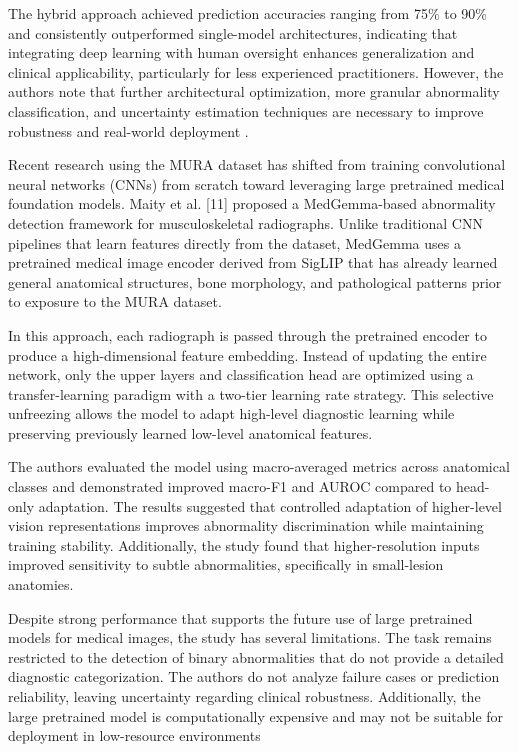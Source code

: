\documentclass[conference]{IEEEtran}
\begin{document}
The hybrid approach achieved prediction accuracies ranging from 75\% to 90\% and consistently outperformed single-model architectures, indicating that integrating deep learning with human oversight enhances generalization and clinical applicability, particularly for less experienced practitioners. However, the authors note that further architectural optimization, more granular abnormality classification, and uncertainty estimation techniques are necessary to improve robustness and real-world deployment \cite{duan2024_msk_xray_dl}.

Recent research using the MURA dataset has shifted from training convolutional neural networks (CNNs) from scratch toward leveraging large pretrained medical foundation models. Maity et al. [11] proposed a MedGemma-based abnormality detection framework for musculoskeletal radiographs. Unlike traditional CNN pipelines that learn features directly from the dataset, MedGemma uses a pretrained medical image encoder derived from SigLIP that has already learned general anatomical structures, bone morphology, and pathological patterns prior to exposure to the MURA dataset.

In this approach, each radiograph is passed through the pretrained encoder to produce a high-dimensional feature embedding. Instead of updating the entire network, only the upper layers and classification head are optimized using a transfer-learning paradigm with a two-tier learning rate strategy. This selective unfreezing allows the model to adapt high-level diagnostic learning while preserving previously learned low-level anatomical features.

The authors evaluated the model using macro-averaged metrics across anatomical classes and demonstrated improved macro-F1 and AUROC compared to head-only adaptation. The results suggested that controlled adaptation of higher-level vision representations improves abnormality discrimination while maintaining training stability. Additionally, the study found that higher-resolution inputs improved sensitivity to subtle abnormalities, specifically in small-lesion anatomies. 

Despite strong performance that supports the future use of large pretrained models for medical images, the study has several limitations. The task remains restricted to the detection of binary abnormalities that do not provide a detailed diagnostic categorization. The authors do not analyze failure cases or prediction reliability, leaving uncertainty regarding clinical robustness. Additionally, the large pretrained model is computationally expensive and may not be suitable for deployment in low-resource environments 
\end{document}
